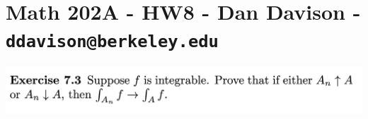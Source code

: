 \section{Math 202A - HW8 - Dan Davison - \texttt{ddavison@berkeley.edu}}

\begin{mdframed}
\includegraphics[width=400pt]{img/analysis--berkeley-202a-hw08-2798.png}
\end{mdframed}

